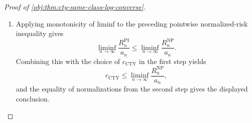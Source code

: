 \documentclass[11pt]{article}
\begin{document}
\begin{proof}[Proof of \cref{obj:thm:cty-same-class-log-converse}]
\begin{enumerate}
Second, for a common-map rule the two expectation conventions coincide term by term.  Fix \(P\in\mathcal P_{\mathrm{NP}}(L,q)\) and a common map \(T_n\), and write the boundary loss at the sample point \(w\) as
\[
\Lambda_P(w)=\sup_{x\in\operatorname{bd}(\mathcal X_P)}
\bigl|T_n\bigl(V_{n,P}(x)\big|_{w}\bigr)-\mu_P(x)\bigr| .
\]
The map
\[
(x,w)\longmapsto
\bigl|T_n\bigl(V_{n,P}(x)\big|_{w}\bigr)-\mu_P(x)\bigr|,
\qquad
(x,w)\in\operatorname{bd}(\mathcal X_P)\times(\mathbb R\times\mathbb R^2)^n,
\]
is jointly Borel: \(T_n\) is measurable, \((x,w)\mapsto V_{n,P}(x)|_{w}\) is continuous in \(x\) and Borel in \(w\), and \(\mu_P\) is continuous on the compact set \(\mathcal X_P\supseteq\operatorname{bd}(\mathcal X_P)\) because it lies in the Hölder ball of \cref{obj:synth_36}.
Consequently, for every level \(a\),
\[
\{w:\Lambda_P(w)>a\}
=
\Bigl\{w:\exists\,x\in\operatorname{bd}(\mathcal X_P),\ \bigl|T_n\bigl(V_{n,P}(x)\big|_{w}\bigr)-\mu_P(x)\bigr|>a\Bigr\}
\]
is the projection onto the sample coordinate of a Borel subset of the product of the Polish space \(\operatorname{bd}(\mathcal X_P)\) with the sample space, hence an analytic set.
Analytic sets are universally measurable, so every superlevel set of \(\Lambda_P\) is measurable for the completion of the product law generated by \(P\); therefore \(\Lambda_P\) is measurable on that completed space and its completed integral coincides with its outer expectation,
\[
\int \Lambda_P\,d\overline{P^{\,n}}
=
\mathbb E_P^*\left[\sup_{x\in\operatorname{bd}(\mathcal X_P)}\bigl|\widehat\mu_n(x)-\mu_P(x)\bigr|\right].
\]

Taking the supremum over \(P\in\mathcal P_{\mathrm{NP}}(L,q)\) in the last display and then the infimum over the larger point-indexed class in \cref{obj:def:point-indexed-distance-risk} bounds \(R_n^{\mathrm{PI}}\) above by the common-map risk in \cref{obj:def:cty-distance-risk}, which is the displayed inequality.  Dividing by the same nonnegative normalizing factor preserves this order:
\[
\frac{R_n^{\mathrm{PI}}}{a_n}
\leq
\frac{R_n^{\mathrm{NP}}}{a_n}.
\]

\item Applying monotonicity of liminf to the preceding pointwise normalized-risk inequality gives
\[
\liminf_{n\to\infty}\frac{R_n^{\mathrm{PI}}}{a_n}
\leq
\liminf_{n\to\infty}\frac{R_n^{\mathrm{NP}}}{a_n}.
\]
Combining this with the choice of \(c_{\mathrm{CTY}}\) in the first step yields
\[
c_{\mathrm{CTY}}
\leq
\liminf_{n\to\infty}\frac{R_n^{\mathrm{NP}}}{a_n},
\]
and the equality of normalizations from the second step gives the displayed conclusion.
\end{enumerate}
\end{proof}
\end{document}
